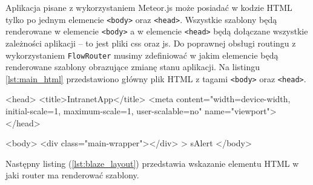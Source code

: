 Aplikacja pisane z wykorzystaniem Meteor.js może posiadać w kodzie HTML tylko po jednym elemencie \verb|<body>| oraz \verb|<head>|. Wszystkie szablony będą renderowane w elemencie \verb|<body>| a w elemencie \verb|<head>| będą dołączane wszystkie zależności aplikacji -- to jest pliki css oraz js. Do poprawnej obsługi routingu z wykorzystaniem \verb|FlowRouter| musimy zdefiniować w jakim elemencie będą renderowane szablony obrazujące zmianę stanu aplikacji. Na listingu \ref{lst:main_html} przedstawiono główny plik HTML z tagami \verb|<body>| oraz \verb|<head>|. 
\begin{html}[caption={Główny plik HTML},label={lst:main_html}]
<head>
    <title>IntranetApp</title>
    <meta content="width=device-width, initial-scale=1, maximum-scale=1, user-scalable=no" name="viewport">
</head>

<body>
<div class="main-wrapper"></div>
{{> sAlert}}
</body>
\end{html}
Następny listing (\ref{lst:blaze_layout}) przedstawia wskazanie elementu HTML w jaki router ma renderować szablony. 

